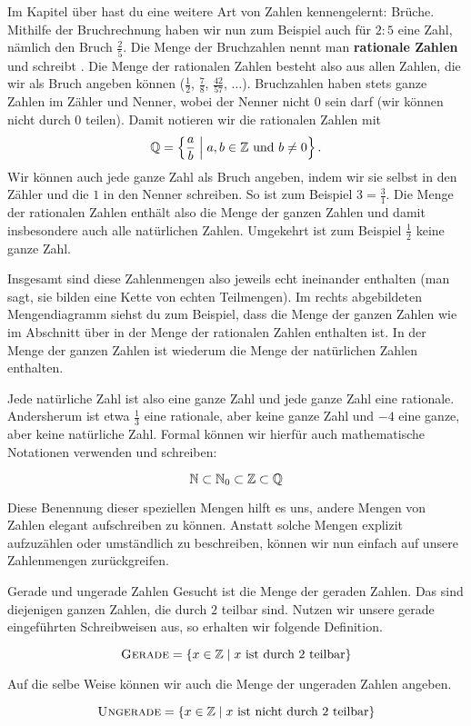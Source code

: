 \documentclass[../../main.tex]{subfiles}
\begin{document}
	Im Kapitel über  hast du eine weitere Art von Zahlen kennengelernt: Brüche. Mithilfe der Bruchrechnung haben wir nun zum Beispiel auch für $2 : 5$ eine Zahl, nämlich den Bruch $\frac{2}{5}$. Die Menge der Bruchzahlen nennt man \textbf{rationale Zahlen} und schreibt \Rational. Die Menge der rationalen Zahlen besteht also aus allen Zahlen, die wir als Bruch angeben können ($\frac{1}{2}$, $\frac{7}{8}$, $\frac{42}{57}$, $\ldots$). Bruchzahlen haben stets ganze Zahlen im Zähler und Nenner, wobei der Nenner nicht 0 sein darf (wir können nicht durch 0 teilen). Damit notieren wir die rationalen Zahlen mit
	$$\mathbb{Q} = \left\{\frac{a}{b} \;\middle|\; a, b \in \mathbb{Z} \text{ und } b \neq 0\right\}.$$	
	Wir können auch jede ganze Zahl als Bruch angeben, indem wir sie selbst in den Zähler und die $1$ in den Nenner schreiben. So ist zum Beispiel $3 = \frac{3}{1}$. Die Menge der rationalen Zahlen enthält also die Menge der ganzen Zahlen und damit insbesondere auch alle natürlichen Zahlen. Umgekehrt ist zum Beispiel $\frac{1}{2}$ keine ganze Zahl.
	
	Insgesamt sind diese Zahlenmengen also jeweils echt ineinander enthalten (man sagt, sie bilden eine Kette von echten Teilmengen). Im rechts abgebildeten Mengendiagramm siehst du zum Beispiel, dass die Menge der ganzen Zahlen wie im Abschnitt über  in der Menge der rationalen Zahlen enthalten ist. In der Menge der ganzen Zahlen ist wiederum die Menge der natürlichen Zahlen enthalten. 
	
	Jede natürliche Zahl ist also eine ganze Zahl und jede ganze Zahl eine rationale. Andersherum ist etwa $\frac{1}{3}$ eine rationale, aber keine ganze Zahl und $-4$ eine ganze, aber keine natürliche Zahl. Formal können wir hierfür auch mathematische Notationen verwenden und schreiben:
	
	$$\mathbb{N} \subset \mathbb{N}_0 \subset \mathbb{Z} \subset \mathbb{Q}$$
	
	Diese Benennung dieser speziellen Mengen hilft es uns, andere Mengen von Zahlen elegant aufschreiben zu können. Anstatt solche Mengen explizit aufzuzählen oder umständlich zu beschreiben, können wir nun einfach auf unsere Zahlenmengen zurückgreifen.

	\begin{example}{Gerade und ungerade Zahlen}
		Gesucht ist die Menge der geraden Zahlen. Das sind diejenigen ganzen Zahlen, die durch $2$ teilbar sind. Nutzen wir unsere gerade eingeführten Schreibweisen aus, so erhalten wir folgende Definition.
		
		$$\textsc{Gerade} = \left\{x\in\mathbb{Z} \mid x \text{ ist durch $2$ teilbar}\right\}$$
		
		Auf die selbe Weise können wir auch die Menge der ungeraden Zahlen angeben.
		
		$$\textsc{Ungerade} = \left\{x\in\mathbb{Z} \mid x \text{ ist nicht durch $2$ teilbar}\right\}$$
	\end{example}
	
\end{document}
